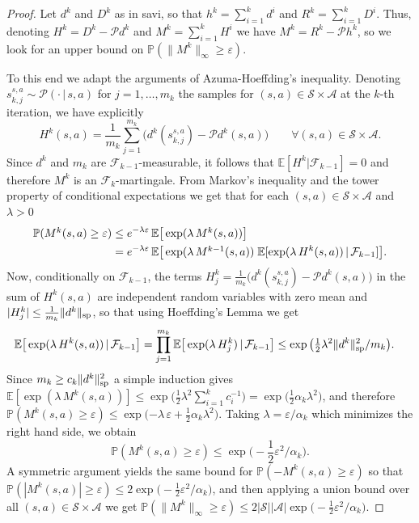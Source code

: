 \documentclass{article}
\newcommand{\cA}{\mathcal{A}}
\newcommand{\cS}{\mathcal{S}}
\newcommand{\cP}{\mathcal{P} }
\newcommand{\expec}{\mathbb{E}}
\newcommand{\prob}{\mathbb{P}}
\renewcommand{\sp}[1]{\|{#1}\|_\text{\rm sp}}
\theoremstyle{plain}
\theoremstyle{definition}
\theoremstyle{remark}
\begin{document}
\begin{proof}
    Let $d^k$ and $D^k$ as in {\sc savi}, so that $h^k=\sum_{i=1}^kd^i$ and $R^k=\sum_{i=1}^kD^i$. Thus,  denoting $H^k=D^k-\cP d^k$ and $M^k=\sum_{i=1}^kH^i$ we have $M^k=R^k-\cP h^k$, so we look for an upper bound on $\prob(\|M^k\|_\infty\geq\varepsilon)$. 
    
    To this end we adapt the arguments of Azuma-Hoeffding's inequality.
    Denoting $s_{k,j}^{s,a}\sim \cP(\cdot \,|\, s,a)$ for $j=1,\ldots,m_k$ the samples for $(s,a)\in\cS\times \cA$ at the $k$-th iteration, we have explicitly 
     $$ H^{k}(s,a) =\mbox{$\frac{1}{m_k}\sum_{j=1}^{m_k}\big(d^k(s^{s,a}_{k,j})$}-\cP d^k(s,a)\big)\qquad\forall (s,a)\in\cS\times\cA.$$ 
     Since $d^k$ and $m_k$ are $\mathcal{F}_{k-1}$-measurable, it follows that $\expec{[H^{k}|\mathcal{F}_{k-1}]}=0$ 
     and therefore $M^k$ is an $\mathcal{F}_{k}$-martingale.
From Markov's inequality and the tower property of conditional expectations we get that for each $(s,a)\in\cS\times \cA$ and $\lambda>0$
\begin{align*}
   \mbox{$ \prob( M^k(s,a) \ge \varepsilon)$} %
   & \le e^{-\lambda\varepsilon}\,\expec\big[\exp(\lambda\, \mbox{$M^k(s,a)$})\big]\\
   &= e^{-\lambda\varepsilon}\,\expec\big[\exp(\lambda\,\mbox{$M^{k-1}(s,a)$}) \;\expec[\exp(\lambda \, H^{k}(s,a)) \,|\, \mathcal{F}_{k-1}]\big].
\end{align*}
Now, conditionally on $\mathcal{F}_{k-1}$, the terms $H^k_j=\mbox{$\frac{1}{m_k}\big(d^k(s^{s,a}_{k,j})$}-\cP d^k(s,a)\big)$ in the sum of $H^k(s,a)$ are independent random variables with zero mean  and $|H^k_j| \le \frac{1}{m_k}\sp{d^k}$, so that  using Hoeffding's Lemma we get
\begin{align*}
    \expec\big[\exp(\lambda\,H^{k}(s,a)) \,|\, \mathcal{F}_{k-1}\big]  &=\prod_{j=1}^{m_k}\expec\big[\exp(\lambda\,H^k_j) \,|\, \mathcal{F}_{k-1}\big] 
    \le \exp\big(\mbox{$\frac{1}{2}$}\lambda^2\sp{d^k}^2/m_k\big).
\end{align*}
Since $m_k\geq c_k\sp{d^k}^2$ a simple induction gives $\expec[\exp(\lambda\,M^k(s,a))] \leq\exp\big(\frac{1}{2}\lambda^2\sum^k_{i=1}\!c_i^{-1}\big)=\exp\big(\frac{1}{2}\alpha_k\lambda^2\big)$, 
and therefore 
$\prob(M^k(s,a)\geq\varepsilon)\leq \exp\big(\mbox{$-\lambda\,\varepsilon+\frac{1}{2}\alpha_k\lambda^2$}\big)$.
Taking $\lambda=\varepsilon/\alpha_k$ which minimizes the right hand side, we obtain
$$\prob(M^k(s,a)\geq\varepsilon)\leq \exp\big(\!-\mbox{$\frac{1}{2}$}\varepsilon^2/\alpha_k\big).$$
A symmetric argument yields the same bound for $\prob(-M^k(s,a)\geq\varepsilon)$ so that 
$\prob(|M^k(s,a)|\geq\varepsilon)\leq 2\exp\big(\!-\mbox{$\frac{1}{2}$}\varepsilon^2/\alpha_k\big)$, and then applying a union bound over all $(s,a)\in\cS\times\cA$ we get $\prob(\|M^k\|_\infty\geq\varepsilon)\leq 2|\cS||\cA|\exp\big(\!-\mbox{$\frac{1}{2}$}\varepsilon^2/\alpha_k\big)$.
\end{proof}

\fi
\end{document}
